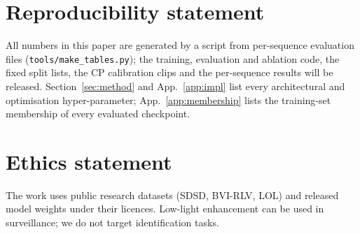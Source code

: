 \section*{Reproducibility statement}
All numbers in this paper are generated by a script from per-sequence evaluation files (\texttt{tools/make\_tables.py}); the training, evaluation and ablation code, the fixed split lists, the CP calibration clips and the per-sequence results will be released. Section~\ref{sec:method} and App.~\ref{app:impl} list every architectural and optimisation hyper-parameter; App.~\ref{app:membership} lists the training-set membership of every evaluated checkpoint.

\section*{Ethics statement}
The work uses public research datasets (SDSD, BVI-RLV, LOL) and released model weights under their licences. Low-light enhancement can be used in surveillance; we do not target identification tasks.
